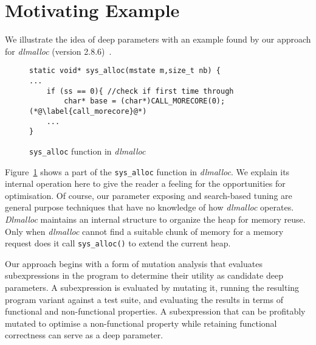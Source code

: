 \vspace{-2.0em}
\section{Motivating Example}

We illustrate the idea of deep parameters with an example found by our approach for \emph{dlmalloc} (version 2.8.6)~\cite{lea1996memory}.


\begin{figure}[ht]
\vspace{-1.5em}
\begin{lstlisting}
static void* sys_alloc(mstate m,size_t nb) {
...
	if (ss == 0){ //check if first time through
		char* base = (char*)CALL_MORECORE(0); (*@\label{call_morecore}@*)
	...
}
\end{lstlisting}
\vspace{-2em}
\caption{{\tt sys\_alloc} function in \emph{dlmalloc}}
\label{exp}
\end{figure}
\vspace{-1em}

Figure~\ref{exp} shows a part of the {\tt sys\_alloc} function in \emph{dlmalloc}. We explain its internal operation here to give the reader a feeling for the opportunities for optimisation. Of course, our parameter exposing and search-based tuning are general purpose techniques that have no knowledge of how \emph{dlmalloc} operates. \emph{Dlmalloc} maintains an internal structure to organize the heap for memory reuse. Only when \emph{dlmalloc} cannot find a suitable chunk of memory for a memory request does it call {\tt sys\_alloc()} to extend the current heap.



Our approach begins with a form of mutation analysis that evaluates
subexpressions in the program to determine their utility as candidate
deep parameters. A subexpression is evaluated by mutating it, running
the resulting program variant against a test suite, and evaluating the
results in terms of functional and non-functional properties. A
subexpression that can be profitably mutated to optimise a non-functional
property while retaining functional correctness can serve as a deep
parameter.  

